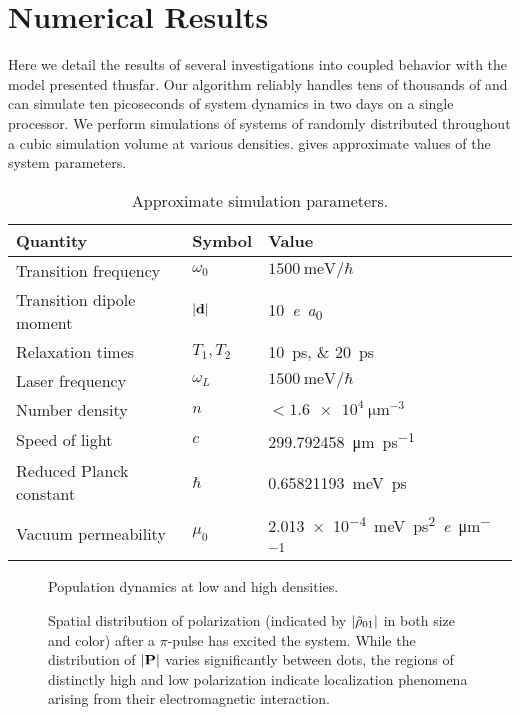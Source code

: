 \section{Numerical Results}
Here we detail the results of several investigations into coupled \qd{} behavior with the model presented thusfar.
Our algorithm reliably handles tens of thousands of \qds{} and can simulate ten picoseconds of system dynamics in two days on a single processor.
We perform simulations of systems of \qds{} randomly distributed throughout a cubic simulation volume at various densities.
 gives approximate values of the system parameters.

\begin{table}
  \begin{ruledtabular}
    \begin{tabular}{lll}
      Quantity                 & Symbol         & Value                        \\ \hline
      Transition frequency     & $\omega_0$     & $\SI{1500}{\milli\eV}/\hbar$ \\
      Transition dipole moment & $\abs{\vb{d}}$ & \SI{10}{\elementarycharge\bohr} \\
      Relaxation times         & $T_{1}, T_{2}$ & \SIlist{10;20}{\pico\second} \\
      Laser frequency          & $\omega_L$     & $\SI{1500}{\milli\eV}/\hbar$ \\
      Number density           & $n$            & $< \SI{1.6e4}{\micro\meter\tothe{-3}}$ \\
      \hline
      Speed of light           & $c$            & \SI{299.792458}{\micro\meter\per\pico\second} \\
      Reduced Planck constant  & $\hbar$        & \SI{0.65821193}{\milli\eV \pico\second} \\
      Vacuum permeability      & $\mu_0$        & \SI{2.013e-4}{\milli\eV \pico\second\squared \per \elementarycharge \per \micro\meter}
    \end{tabular}
  \end{ruledtabular}
  \caption{\label{table:parameters}Approximate simulation parameters.}
\end{table}

\begin{figure}
  
  \caption{\label{fig:density stats}Population dynamics at low and high densities.}
\end{figure}

\begin{figure}
  
  \caption{\label{fig:polarization vis}Spatial distribution of polarization (indicated by $\abs{\tilde{\rho}_{01}}$ in both size and color) after a $\pi$-pulse has excited the system. While the distribution of $\abs{\vb{P}}$ varies significantly between dots, the regions of distinctly high and low polarization indicate localization phenomena arising from their electromagnetic interaction.}
\end{figure}

\lipsum
